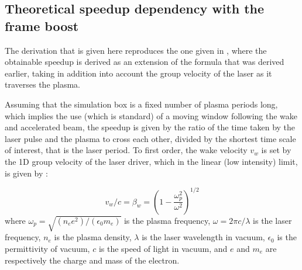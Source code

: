 \subsection{Theoretical speedup dependency with the frame boost}
The derivation that is given here reproduces the one given in \cite{Vaypop2011}, where the obtainable speedup is derived as an extension of the formula that was derived earlier\cite{Vayprl07}, taking in addition into account the group velocity of the laser as it traverses the plasma.

Assuming that the simulation box is a fixed number of plasma periods long, which implies the use (which is standard) of a moving window following
the wake and accelerated beam, the speedup is given by the ratio of the time taken by the laser pulse and the plasma to cross each other, divided by the shortest time scale of interest, that is the laser period. To first order, the wake velocity $v_w$ is set by the 1D group velocity of the laser driver, which in the linear (low intensity) limit, is given by \cite{Esareyrmp09}:

%
\begin{equation}
v_w/c=\beta_w=\left(1-\frac{\omega_p^2}{\omega^2}\right)^{1/2}
\end{equation}
%
where $\omega_p=\sqrt{(n_e e^2)/(\epsilon_0 m_e)}$ is the plasma frequency, $\omega=2\pi c/\lambda$ is the laser frequency, $n_e$ is the plasma density, $\lambda$ is the laser wavelength in vacuum, $\epsilon_0$ is the permittivity of vacuum, $c$ is the speed of light in vacuum, and $e$ and $m_e$ are respectively the charge and mass of the electron.

